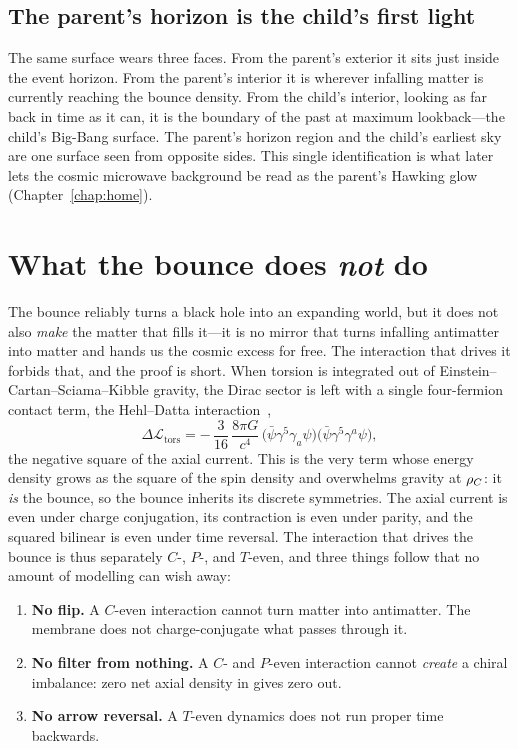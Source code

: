 \subsection{The parent's horizon is the child's first light}

The same surface wears three faces. From the parent's exterior it sits just
inside the event horizon. From the parent's interior it is wherever infalling
matter is currently reaching the bounce density. From the child's interior,
looking as far back in time as it can, it is the boundary of the past at maximum
lookback---the child's Big-Bang surface. The parent's horizon region and the
child's earliest sky are one surface seen from opposite sides. This single
identification is what later lets the cosmic microwave background be read as the
parent's Hawking glow (Chapter~\ref{chap:home}).

\section{What the bounce does \emph{not} do}
\label{sec:cpt-even}

The bounce reliably turns a black hole into an expanding world, but it does not
also \emph{make} the matter that fills it---it is no mirror that turns infalling
antimatter into matter and hands us the cosmic excess for free. The interaction
that drives it forbids that, and the proof is short. When torsion is integrated
out of Einstein--Cartan--Sciama--Kibble gravity, the Dirac sector is left with a
single four-fermion contact term, the Hehl--Datta interaction~\citep{hehl1976},
\[
  \Delta\mathcal{L}_{\mathrm{tors}}
  = -\,\frac{3}{16}\,\frac{8\pi G}{c^4}\,
    \big(\bar\psi\gamma^5\gamma_a\psi\big)\big(\bar\psi\gamma^5\gamma^a\psi\big),
\]
the negative square of the axial current. This is the very term whose energy
density grows as the square of the spin density and overwhelms gravity at $\rho_{C}$:
it \emph{is} the bounce, so the bounce inherits its discrete symmetries. The axial
current is even under charge conjugation, its contraction is even under parity,
and the squared bilinear is even under time reversal. The interaction that drives
the bounce is thus separately $C$-, $P$-, and $T$-even, and three things follow
that no amount of modelling can wish away:

\begin{enumerate}
  \item \textbf{No flip.} A $C$-even interaction cannot turn matter into
    antimatter. The membrane does not charge-conjugate what passes through it.
  \item \textbf{No filter from nothing.} A $C$- and $P$-even interaction cannot
    \emph{create} a chiral imbalance: zero net axial density in gives zero out.
  \item \textbf{No arrow reversal.} A $T$-even dynamics does not run proper time
    backwards.
\end{enumerate}

